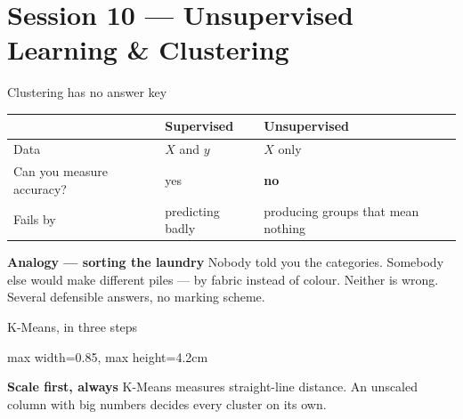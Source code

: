 \documentclass[10pt,aspectratio=169]{beamer}
\newcommand{\trapbox}[2]{%
  \begin{alertblock}{\textbf{#1}}
  #2
  \end{alertblock}%
}
\newcommand{\analogybox}[2]{%
  \begin{exampleblock}{\textbf{Analogy --- #1}}
  #2
  \end{exampleblock}%
}
\begin{document}
\section{Session 10 --- Unsupervised Learning \& Clustering}

\begin{frame}{Clustering has no answer key}
\begin{table}
\small
\begin{tabularx}{\linewidth}{@{}lXX@{}}
\toprule
& \textbf{Supervised} & \textbf{Unsupervised} \\
\midrule
Data & $X$ and $y$ & $X$ only \\
Can you measure accuracy? & yes & \textbf{no} \\
Fails by & predicting badly & producing groups that mean nothing \\
\bottomrule
\end{tabularx}
\end{table}
\analogybox{sorting the laundry}{Nobody told you the categories. Somebody else would make different piles --- by fabric instead of colour. Neither is wrong. Several defensible answers, no marking scheme.}
\end{frame}

\begin{frame}{K-Means, in three steps}
\begin{center}
\begin{adjustbox}{max width=0.85\linewidth, max height=4.2cm}
\end{adjustbox}
\end{center}
\trapbox{Scale first, always}{K-Means measures straight-line distance. An unscaled column with big numbers decides every cluster on its own.}
\end{frame}
\end{document}
